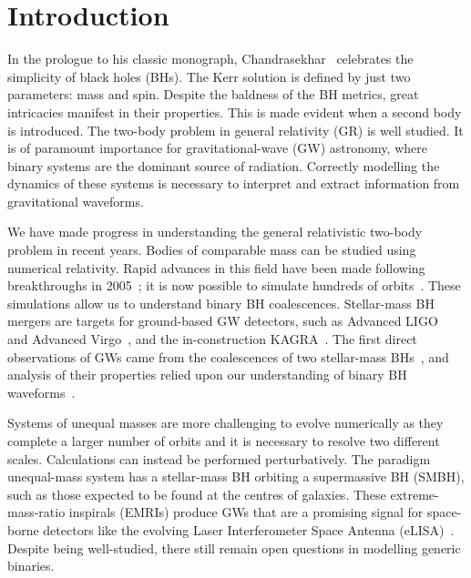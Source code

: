 \documentclass[aps,prd,amsfonts,amssymb,amsmath,nofootinbib,showpacs,superscriptaddress,twocolumn]{revtex4}
\begin{document}
\maketitle

\section{Introduction}

In the prologue to his classic monograph, Chandrasekhar~\cite{Chandrasekhar1992} celebrates the simplicity of black holes (BHs). The Kerr solution is defined by just two parameters: mass and spin. Despite the baldness of the BH metrics, great intricacies manifest in their properties. This is made evident when a second body is introduced. The two-body problem in general relativity (GR) is well studied. It is of paramount importance for gravitational-wave (GW) astronomy, where binary systems are the dominant source of radiation. Correctly modelling the dynamics of these systems is necessary to interpret and extract information from gravitational waveforms.

We have made progress in understanding the general relativistic two-body problem in recent years. Bodies of comparable mass can be studied using numerical relativity. Rapid advances in this field have been made following breakthroughs in 2005~\cite{Pretorius2005,Campanelli2006,Baker2006}; it is now possible to simulate hundreds of orbits~\cite{Szilagyi2015}. These simulations allow us to understand binary BH coalescences. Stellar-mass BH mergers are targets for ground-based GW detectors, such as Advanced LIGO~\cite{Aasi2015} and Advanced Virgo~\cite{Acernese2015}, and the in-construction KAGRA~\cite{Aso2013}. The first direct observations of GWs came from the coalescences of two stellar-mass BHs~\cite{Abbott2016,Abbott2016e,Abbott2016d}, and analysis of their properties relied upon our understanding of binary BH waveforms~\cite{Abbott2016f,Abbott2016h,Abbott2016d}. %

Systems of unequal masses are more challenging to evolve numerically as they complete a larger number of orbits and it is necessary to resolve two different scales. Calculations can instead be performed perturbatively. The paradigm unequal-mass system has a stellar-mass BH orbiting a supermassive BH (SMBH), such as those expected to be found at the centres of galaxies. These extreme-mass-ratio inspirals (EMRIs) produce GWs that are a promising signal for space-borne detectors like the evolving Laser Interferometer Space Antenna (eLISA)~\cite{Amaro-Seoane2007,Amaro-Seoane2012a}. Despite being well-studied, there still remain open questions in modelling generic binaries.
\end{document}
